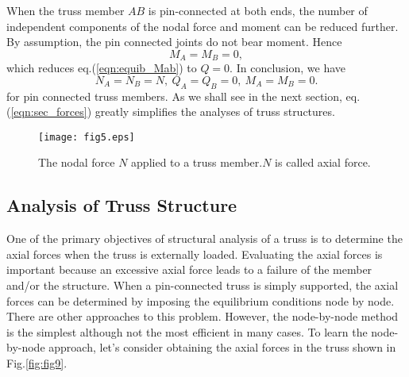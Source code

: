 ﻿\documentclass[10pt,a4j]{article}
\begin{document}
When the truss member $AB$ is pin-connected at both ends, the 
number of independent components of the nodal force and moment can be reduced further. 
By assumption, the pin connected joints do not bear moment. Hence   
\begin{equation}
		M_A=M_B=0, 
	\label{eqn:}
\end{equation}
which reduces eq.(\ref{eqn:equib_Mab}) to $Q=0$.
In conclusion, we have 
\begin{equation}
	N_A=N_B=N,\  Q_A=Q_B=0, \  M_A=M_B=0.
	\label{eqn:sec_forces}
\end{equation}
for pin connected truss members.  
As we shall see in the next section, eq.(\ref{eqn:sec_forces}) greatly simplifies the analyses of truss structures. 
\begin{figure}[h]
	\begin{center}
	\texttt{[image: fig5.eps]} 
	\end{center}
	\caption{The nodal force $N$ applied to a truss member.$N$ is called axial force.}
	\label{fig:fig5}
\end{figure}
%
%
\subsection{Analysis of Truss Structure}
One of the primary objectives of structural analysis of a truss is to determine the axial forces when the truss is externally loaded. Evaluating the axial forces is important because an excessive axial force leads to a failure of the member and/or the structure. When a pin-connected truss is simply supported, the axial forces can be determined by imposing the equilibrium conditions node by node. There are other approaches to this problem. However, the node-by-node method is the simplest although not the most efficient in many cases. To learn the node-by-node approach, let's consider obtaining the axial forces in the truss shown in Fig.\ref{fig:fig9}.\\ 
\end{document}
